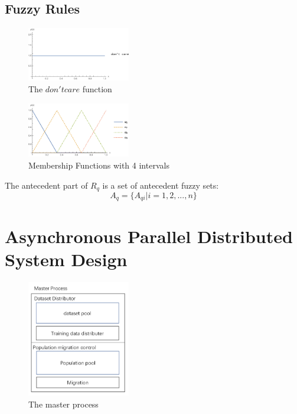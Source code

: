 \documentclass[conference]{IEEEtran}
\begin{document}
  \subsection{Fuzzy Rules}
  
  \begin{figure}[H]
 	\centering
 	\includegraphics[width=0.4\textwidth]{figures/u1.png}
   \caption{The $don't care$ function}\label{fig:digit}
   \label{u0}
 \end{figure}
 \begin{figure}[H]
 	\centering
 	\includegraphics[width=0.4\textwidth]{figures/u4.png}
   \caption{Membership Functions with 4 intervals}\label{fig:digit}
   \label{u3}
 \end{figure}
  The antecedent part of $R_q$ is a set of antecedent fuzzy sets:
\begin{equation}A_q = \{A_{qi}|i = 1,2,...,n\}\end{equation}

   
  \section{Asynchronous Parallel Distributed System Design}
  
  \begin{figure}[H]
    \centering
    \includegraphics[width = 0.4\textwidth]{figures/master.png}
    \caption{The master process}
    \label{fig:master}
  \end{figure}
\end{document}
